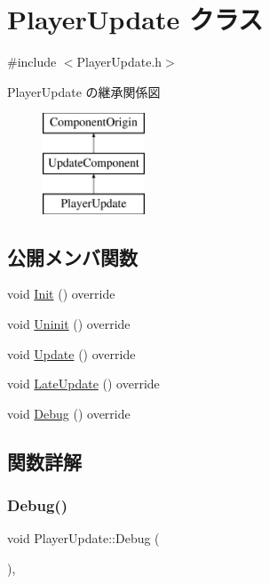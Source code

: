 \hypertarget{class_player_update}{}\section{Player\+Update クラス}
\label{class_player_update}


{\ttfamily \#include $<$Player\+Update.\+h$>$}

Player\+Update の継承関係図\begin{figure}[H]
\begin{center}
\leavevmode
\includegraphics[height=3.000000cm]{class_player_update}
\end{center}
\end{figure}
\subsection*{公開メンバ関数}
\begin{DoxyCompactItemize}
\item 
void \mbox{\hyperlink{class_player_update_ac72b39db7b7bfaf094bde9ed1adef4b7}{Init}} () override
\item 
void \mbox{\hyperlink{class_player_update_a997e0813a825d7525da4b5b89a290168}{Uninit}} () override
\item 
void \mbox{\hyperlink{class_player_update_af6e1b8ca60399f232e64d2acb4968c75}{Update}} () override
\item 
void \mbox{\hyperlink{class_player_update_ae376f517f3458edfef61ac366aa78e36}{Late\+Update}} () override
\item 
void \mbox{\hyperlink{class_player_update_a37e2d025997e1b60d6a02658b00dd503}{Debug}} () override
\end{DoxyCompactItemize}


\subsection{関数詳解}
\mbox{\label{class_player_update_a37e2d025997e1b60d6a02658b00dd503}} 
\subsubsection{\texorpdfstring{Debug()}{Debug()}}
{\footnotesize\ttfamily void Player\+Update\+::\+Debug (\begin{DoxyParamCaption}{ }\end{DoxyParamCaption})\hspace{0.3cm}{\ttfamily [override]}, {\ttfamily [virtual]}}



